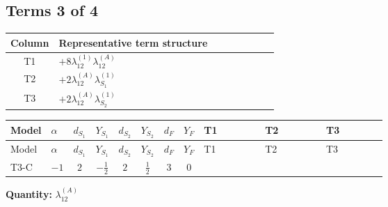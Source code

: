 \documentclass[8pt]{article}
\begin{document}
\begin{landscape}
\subsection*{Terms 3 of 4}
\begin{center}
\begin{tabular}{@{}c >{\raggedright\arraybackslash}p{0.82\linewidth}@{}}
\toprule
Column & Representative term structure \\
\midrule
T1 & \(\displaystyle +8 {\lambda_{12}^{(1)}} {\lambda_{12}^{(A)}}\) \\
\midrule
T2 & \(\displaystyle +2 {\lambda_{12}^{(A)}} {\lambda_{S_1}^{(1)}}\) \\
\midrule
T3 & \(\displaystyle +2 {\lambda_{12}^{(A)}} {\lambda_{S_2}^{(1)}}\) \\
\midrule
\bottomrule
\end{tabular}
\end{center}
\smallskip
\tiny
\begin{longtable}{@{}llcccccc >{\raggedright\arraybackslash}p{0.21\linewidth} >{\raggedright\arraybackslash}p{0.21\linewidth} >{\raggedright\arraybackslash}p{0.21\linewidth}@{}}
\toprule
Model & $\alpha$ & $d_{S_1}$ & $Y_{S_1}$ & $d_{S_2}$ & $Y_{S_2}$ & $d_F$ & $Y_F$ & T1 & T2 & T3 \\
\midrule
\endfirsthead
\toprule
Model & $\alpha$ & $d_{S_1}$ & $Y_{S_1}$ & $d_{S_2}$ & $Y_{S_2}$ & $d_F$ & $Y_F$ & T1 & T2 & T3 \\
\midrule
\endhead
T3-C & $-1$ & $2$ & $-\frac{1}{2}$ & $2$ & $\frac{1}{2}$ & $3$ & $0$ & \scriptsize\adjustbox{max width=\linewidth}{$\begin{gathered} +8 {\lambda_{12}^{(1)}} {\lambda_{12}^{(A)}}\end{gathered}$} & \scriptsize\adjustbox{max width=\linewidth}{$\begin{gathered} +2 {\lambda_{12}^{(A)}} {\lambda_{S_1}^{(1)}}\end{gathered}$} & \scriptsize\adjustbox{max width=\linewidth}{$\begin{gathered} +2 {\lambda_{12}^{(A)}} {\lambda_{S_2}^{(1)}}\end{gathered}$} \\
\midrule
\bottomrule
\end{longtable}
\clearpage
\noindent\textbf{Quantity: }$\lambda_{12}^{(A)}$\par\smallskip

\end{landscape}
\end{document}
